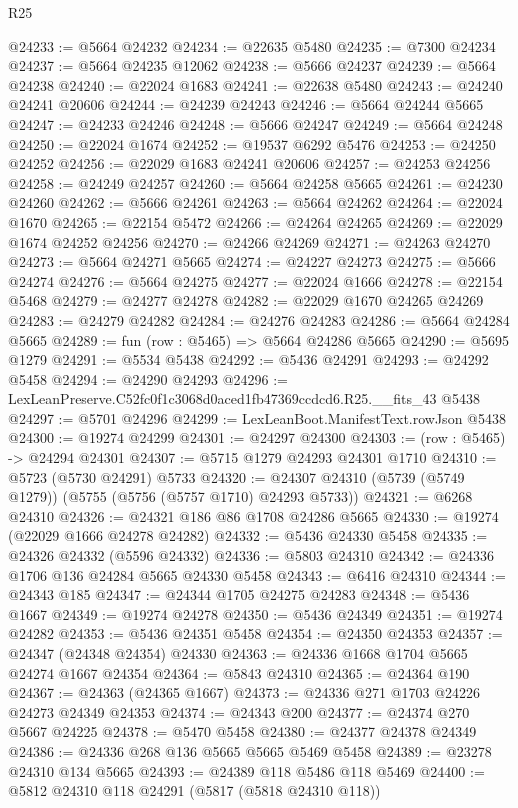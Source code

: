 \begin{lexlean}{R25}
\begin{coremodule}
@24233 := @5664 @24232
@24234 := @22635 @5480
@24235 := @7300 @24234
@24237 := @5664 @24235 @12062
@24238 := @5666 @24237
@24239 := @5664 @24238
@24240 := @22024 @1683
@24241 := @22638 @5480
@24243 := @24240 @24241 @20606
@24244 := @24239 @24243
@24246 := @5664 @24244 @5665
@24247 := @24233 @24246
@24248 := @5666 @24247
@24249 := @5664 @24248
@24250 := @22024 @1674
@24252 := @19537 @6292 @5476
@24253 := @24250 @24252
@24256 := @22029 @1683 @24241 @20606
@24257 := @24253 @24256
@24258 := @24249 @24257
@24260 := @5664 @24258 @5665
@24261 := @24230 @24260
@24262 := @5666 @24261
@24263 := @5664 @24262
@24264 := @22024 @1670
@24265 := @22154 @5472
@24266 := @24264 @24265
@24269 := @22029 @1674 @24252 @24256
@24270 := @24266 @24269
@24271 := @24263 @24270
@24273 := @5664 @24271 @5665
@24274 := @24227 @24273
@24275 := @5666 @24274
@24276 := @5664 @24275
@24277 := @22024 @1666
@24278 := @22154 @5468
@24279 := @24277 @24278
@24282 := @22029 @1670 @24265 @24269
@24283 := @24279 @24282
@24284 := @24276 @24283
@24286 := @5664 @24284 @5665
@24289 := fun (row : @5465) => @5664 @24286 @5665
@24290 := @5695 @1279
@24291 := @5534 @5438
@24292 := @5436 @24291
@24293 := @24292 @5458
@24294 := @24290 @24293
@24296 := LexLeanPreserve.C52fc0f1c3068d0aced1fb47369ccdcd6.R25.__fits_43 @5438
@24297 := @5701 @24296
@24299 := LexLeanBoot.ManifestText.rowJson @5438
@24300 := @19274 @24299
@24301 := @24297 @24300
@24303 := (row : @5465) -> @24294 @24301
@24307 := @5715 @1279 @24293 @24301 @1710
@24310 := @5723 (@5730 @24291) @5733
@24320 := @24307 @24310 (@5739 (@5749 @1279)) (@5755 (@5756 (@5757 @1710) @24293 @5733))
@24321 := @6268 @24310
@24326 := @24321 @186 @86 @1708 @24286 @5665
@24330 := @19274 (@22029 @1666 @24278 @24282)
@24332 := @5436 @24330 @5458
@24335 := @24326 @24332 (@5596 @24332)
@24336 := @5803 @24310
@24342 := @24336 @1706 @136 @24284 @5665 @24330 @5458
@24343 := @6416 @24310
@24344 := @24343 @185
@24347 := @24344 @1705 @24275 @24283
@24348 := @5436 @1667
@24349 := @19274 @24278
@24350 := @5436 @24349
@24351 := @19274 @24282
@24353 := @5436 @24351 @5458
@24354 := @24350 @24353
@24357 := @24347 (@24348 @24354) @24330
@24363 := @24336 @1668 @1704 @5665 @24274 @1667 @24354
@24364 := @5843 @24310
@24365 := @24364 @190
@24367 := @24363 (@24365 @1667)
@24373 := @24336 @271 @1703 @24226 @24273 @24349 @24353
@24374 := @24343 @200
@24377 := @24374 @270 @5667 @24225
@24378 := @5470 @5458
@24380 := @24377 @24378 @24349
@24386 := @24336 @268 @136 @5665 @5665 @5469 @5458
@24389 := @23278 @24310 @134 @5665
@24393 := @24389 @118 @5486 @118 @5469
@24400 := @5812 @24310 @118 @24291 (@5817 (@5818 @24310 @118))

\end{coremodule}
\end{lexlean}

